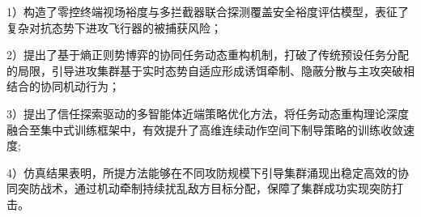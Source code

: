 1）构造了零控终端视场裕度与多拦截器联合探测覆盖安全裕度评估模型，表征了复杂对抗态势下进攻飞行器的被捕获风险；

2）提出了基于熵正则势博弈的协同任务动态重构机制，打破了传统预设任务分配的局限，引导进攻集群基于实时态势自适应形成诱饵牵制、隐蔽分散与主攻突破相结合的协同机动行为；

3）提出了信任探索驱动的多智能体近端策略优化方法，将任务动态重构理论深度融合至集中式训练框架中，有效提升了高维连续动作空间下制导策略的训练收敛速度;

4）仿真结果表明，所提方法能够在不同攻防规模下引导集群涌现出稳定高效的协同突防战术，通过机动牵制持续扰乱敌方目标分配，保障了集群成功实现突防打击。








